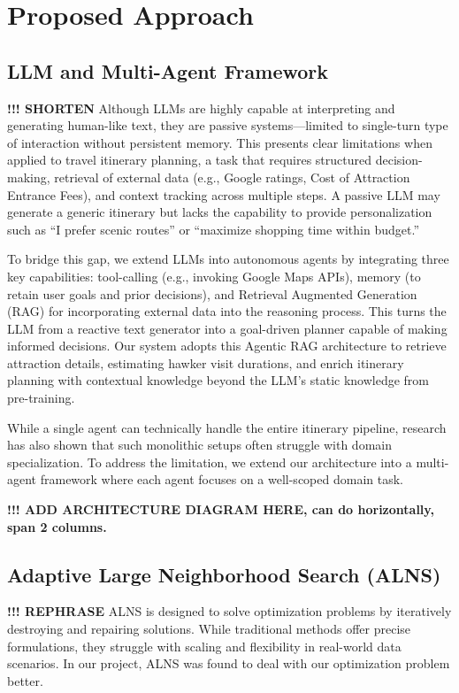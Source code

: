 \documentclass{ecai}
\begin{document}
\section{Proposed Approach}
\subsection{LLM and Multi-Agent Framework}
\textbf{!!! SHORTEN} Although LLMs are highly capable at interpreting and generating human-like text, they are passive systems—limited to single-turn type of interaction without persistent memory. This presents clear limitations when applied to travel itinerary planning, a task that requires structured decision-making, retrieval of external data (e.g., Google ratings, Cost of Attraction Entrance Fees), and context tracking across multiple steps. A passive LLM may generate a generic itinerary but lacks the capability to provide personalization such as “I prefer scenic routes” or “maximize shopping time within budget.”

To bridge this gap, we extend LLMs into autonomous agents by integrating three key capabilities: tool-calling (e.g., invoking Google Maps APIs), memory (to retain user goals and prior decisions), and Retrieval Augmented Generation (RAG) for incorporating external data into the reasoning process. This turns the LLM from a reactive text generator into a goal-driven planner capable of making informed decisions. Our system adopts this Agentic RAG architecture to retrieve attraction details, estimating hawker visit durations, and enrich itinerary planning with contextual knowledge beyond the LLM’s static knowledge from pre-training.

While a single agent can technically handle the entire itinerary pipeline, research has also shown that such monolithic setups often struggle with domain specialization. To address the limitation, we extend our architecture into a multi-agent framework where each agent focuses on a well-scoped domain task.

\textbf{!!! ADD ARCHITECTURE DIAGRAM HERE, can do horizontally, span 2 columns.}

\subsection{Adaptive Large Neighborhood Search (ALNS)}
\textbf{!!! REPHRASE} ALNS is designed to solve optimization problems by iteratively destroying and repairing solutions. While traditional methods offer precise formulations, they struggle with scaling and flexibility in real-world data scenarios. In our project, ALNS was found to deal with our optimization problem better.
\end{document}

